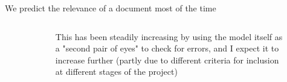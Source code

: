 \documentclass[9pt]{beamer}
\begin{document}
\begin{frame}{We predict the relevance of a document most of the time}
\begin{figure}
\begin{columns}
\begin{column}{0.3812\linewidth}
\begin{figure}
			\end{figure}
		\end{column}
		\begin{column}{0.5\linewidth}
			This has been steadily increasing by using the model itself as a "second pair of eyes" to check for errors, and I expect it to increase further (partly due to different criteria for inclusion at different stages of the project)

\end{column}
\end{columns}
\end{figure}
\end{frame}
\end{document}
